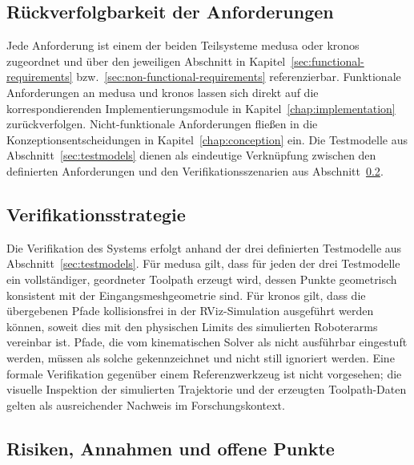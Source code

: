         \subsection{Rückverfolgbarkeit der Anforderungen} \label{subsec:requirements-traceability}
            Jede Anforderung ist einem der beiden Teilsysteme \ac{medusa} oder \ac{kronos} zugeordnet und über den jeweiligen Abschnitt in Kapitel~\ref{sec:functional-requirements} bzw.\ \ref{sec:non-functional-requirements} referenzierbar.
            Funktionale Anforderungen an \ac{medusa} und \ac{kronos} lassen sich direkt auf die korrespondierenden Implementierungsmodule in Kapitel~\ref{chap:implementation} zurückverfolgen.
            Nicht-funktionale Anforderungen fließen in die Konzeptionsentscheidungen in Kapitel~\ref{chap:conception} ein.
            Die Testmodelle aus Abschnitt~\ref{sec:testmodels} dienen als eindeutige Verknüpfung zwischen den definierten Anforderungen und den Verifikationsszenarien aus Abschnitt~\ref{subsec:acceptance-criteria-and-verification-strategy}.

        \subsection{Verifikationsstrategie}\label{subsec:acceptance-criteria-and-verification-strategy}
            Die Verifikation des Systems erfolgt anhand der drei definierten Testmodelle aus Abschnitt~\ref{sec:testmodels}.
            Für \ac{medusa} gilt, dass für jeden der drei Testmodelle ein vollständiger, geordneter Toolpath erzeugt wird,
            dessen Punkte geometrisch konsistent mit der Eingangsmeshgeometrie sind.
            Für \ac{kronos} gilt, dass die übergebenen Pfade kollisionsfrei in der RViz-Simulation ausgeführt werden können,
            soweit dies mit den physischen Limits des simulierten Roboterarms vereinbar ist.
            Pfade, die vom kinematischen Solver als nicht ausführbar eingestuft werden, müssen als solche gekennzeichnet und nicht still ignoriert werden.
            Eine formale Verifikation gegenüber einem Referenzwerkzeug ist nicht vorgesehen;
            die visuelle Inspektion der simulierten Trajektorie und der erzeugten Toolpath-Daten gelten als ausreichender Nachweis im Forschungskontext.

        \subsection{Risiken, Annahmen und offene Punkte}\label{subsec:risks-assumptions-and-open-issues}

